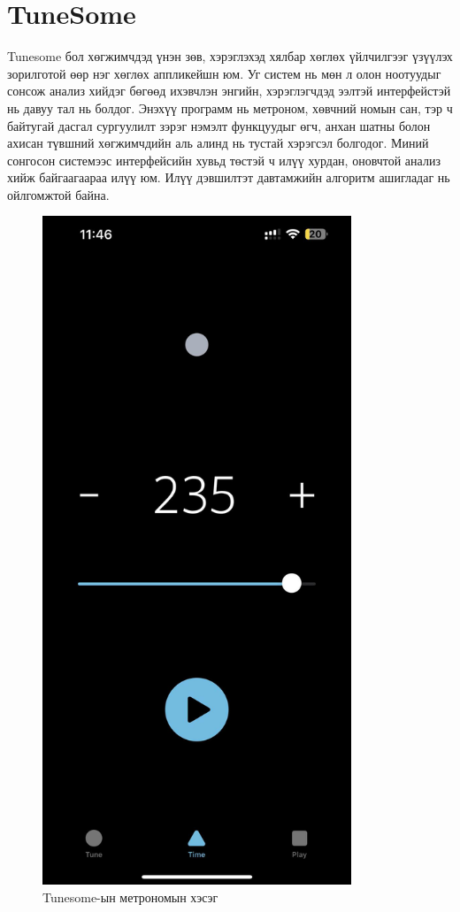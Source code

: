 \section{TuneSome}
Tunesome бол хөгжимчдэд үнэн зөв, хэрэглэхэд хялбар хөглөх үйлчилгээг үзүүлэх зорилготой өөр нэг хөглөх аппликейшн юм. Уг систем нь мөн л олон ноотуудыг сонсож анализ хийдэг бөгөөд ихэвчлэн энгийн, хэрэглэгчдэд ээлтэй интерфейстэй нь давуу тал нь болдог. Энэхүү программ нь метроном, хөвчний номын сан, тэр ч байтугай дасгал сургуулилт зэрэг нэмэлт функцуудыг өгч, анхан шатны болон ахисан түвшний хөгжимчдийн аль алинд нь тустай хэрэгсэл болгодог. Миний сонгосон системээс интерфейсийн хувьд төстэй ч илүү хурдан, оновчтой анализ хийж байгаагаараа илүү юм. Илүү дэвшилтэт давтамжийн алгоритм ашигладаг нь ойлгомжтой байна.
\clearpage
\begin{figure}[h]
	\centering
	\includegraphics[height=20cm]{images/tunersome1.jpg}
	\caption{Tunesome-ын метрономын хэсэг}
	\label{fig:modalform}
\end{figure}
